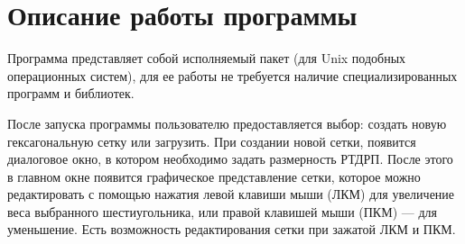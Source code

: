 \chapter{Описание работы программы}
\label{cha:ch_4}


Программа представляет собой исполняемый пакет (для Unix подобных операционных систем), для ее работы не требуется наличие специализированных программ и библиотек.
\par

После запуска программы пользователю предоставляется выбор: создать новую гексагональную сетку или загрузить. При создании новой сетки, появится диалоговое окно, в котором необходимо задать размерность РТДРП. После этого в главном окне появится графическое представление сетки, которое можно редактировать с помощью нажатия левой клавиши мыши (ЛКМ) для увеличение веса выбранного шестиугольника, или правой клавишей мыши (ПКМ) --- для уменьшение. Есть возможность редактирования сетки при зажатой ЛКМ и ПКМ.
\par

